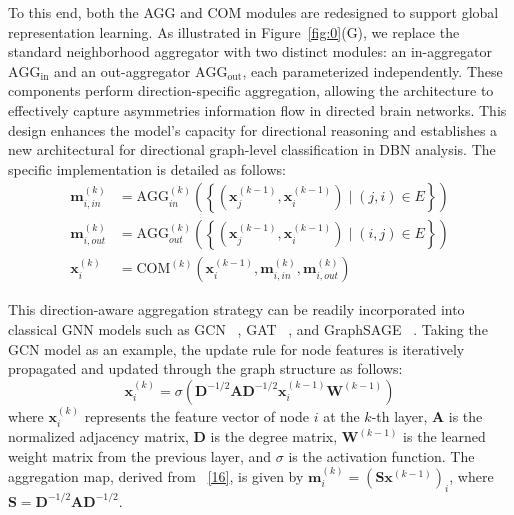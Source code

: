 \documentclass[lettersize,journal]{IEEEtran}
\begin{document}
To this end, both the AGG and COM modules are redesigned to support global representation learning. As illustrated in Figure~\ref{fig:0}(G), we replace the standard neighborhood aggregator with two distinct modules: an in-aggregator $\text{AGG}_{\text{in}}$ and an out-aggregator $\text{AGG}_{\text{out}}$, each parameterized independently. These components perform direction-specific aggregation, allowing the architecture to effectively capture asymmetries information flow in directed brain networks.
This design enhances the model's capacity for directional reasoning and establishes a new architectural for directional graph-level classification in DBN analysis. The specific implementation is detailed as follows:
\begin{align}
\mathbf{m}_{i,in}^{(k)}&=\text{AGG}_{in}^{(k)}\left(\left\{\left(\mathbf{x}_{j}^{(k - 1)},\mathbf{x}_{i}^{(k - 1)}\right)\mid(j,i)\in E\right\}\right)\\
\mathbf{m}_{i,out}^{(k)}&=\text{AGG}_{out}^{(k)}\left(\left\{\left(\mathbf{x}_{j}^{(k - 1)},\mathbf{x}_{i}^{(k - 1)}\right)\mid(i,j)\in E\right\}\right)\\
\mathbf{x}_{i}^{(k)}&=\text{COM}^{(k)}\left(\mathbf{x}_{i}^{(k - 1)},\mathbf{m}_{i,in}^{(k)},\mathbf{m}_{i,out}^{(k)}\right)
\end{align}

This direction-aware aggregation strategy can be readily incorporated into classical GNN models such as GCN~ \cite{kipf2016semi}, GAT~ \cite{velivckovic2017graph}, and GraphSAGE~ \cite{hamilton2017inductive}.
Taking the GCN model as an example, the update rule for node features is iteratively propagated and updated through the graph structure as follows:
\begin{equation}
\mathbf{x}_{i}^{(k)} = \sigma \left( \mathbf{D}^{-1/2} \mathbf{A} \mathbf{D}^{-1/2} \mathbf{x}_{i}^{(k-1)} \mathbf{W}^{(k-1)} \right)
\end{equation}
where \( \mathbf{x}_{i}^{(k)} \) represents the feature vector of node \( i \) at the \( k \)-th layer, \( \mathbf{A} \) is the normalized adjacency matrix, \( \mathbf{D} \) is the degree matrix, \( \mathbf{W}^{(k-1)} \) is the learned weight matrix from the previous layer, and \( \sigma \) is the activation function.
The aggregation map, derived from ~\eqref{16}, is given by \( \mathbf{m}_i^{(k)} = (\mathbf{S} \mathbf{x}^{(k-1)})_i \), where \( \mathbf{S} = \mathbf{D}^{-1/2} \mathbf{A} \mathbf{D}^{-1/2} \).
\end{document}
